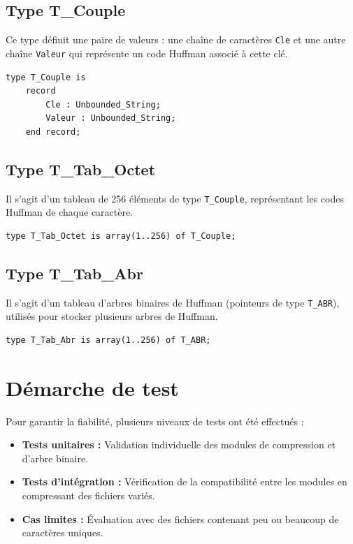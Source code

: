 \documentclass[12pt,a4paper]{article}
\begin{document}
\subsection{Type T\_Couple}
Ce type définit une paire de valeurs : une chaîne de caractères \texttt{Cle} et une autre chaîne \texttt{Valeur} qui représente un code Huffman associé à cette clé.

\begin{verbatim}
type T_Couple is
    record
        Cle : Unbounded_String;
        Valeur : Unbounded_String;
    end record;
\end{verbatim}

\subsection{Type T\_Tab\_Octet}
Il s'agit d'un tableau de 256 éléments de type \texttt{T\_Couple}, représentant les codes Huffman de chaque caractère.

\begin{verbatim}
type T_Tab_Octet is array(1..256) of T_Couple;
\end{verbatim}

\subsection{Type T\_Tab\_Abr}
Il s'agit d'un tableau d'arbres binaires de Huffman (pointeurs de type \texttt{T\_ABR}), utilisés pour stocker plusieurs arbres de Huffman.

\begin{verbatim}
type T_Tab_Abr is array(1..256) of T_ABR;
\end{verbatim}


\section{Démarche de test}
Pour garantir la fiabilité, plusieurs niveaux de tests ont été effectués :
\begin{itemize}
    \item \textbf{Tests unitaires :} Validation individuelle des modules de compression et d'arbre binaire.
    \item \textbf{Tests d'intégration :} Vérification de la compatibilité entre les modules en compressant des fichiers variés.
    \item \textbf{Cas limites :} Évaluation avec des fichiers contenant peu ou beaucoup de caractères uniques.
\end{itemize}
\end{document}
